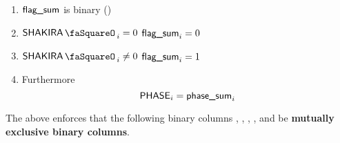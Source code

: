 \begin{enumerate}
	\item  $\textsf{flag\_sum}$ is binary \quad (\trash)
	\item \If $\shakiraStamp_{i} =    0$ \Then $\textsf{flag\_sum}_{i} = 0$
	\item \If $\shakiraStamp_{i} \neq 0$ \Then $\textsf{flag\_sum}_{i} = 1$
	\item Furthermore
	      \[
		      \textsf{PHASE}_{i} = \textsf{phase\_sum}_{i}
	      \]
\end{enumerate}
\saNote{} The above enforces that the following binary columns
\isShakiraKeccakData     {},
\isShakiraKeccakResult   {},
\isShakiraShaTwoData     {},
\isShakiraShaTwoResult   {},
\isShakiraRipemdData     {} and 
\isShakiraRipemdResult   {}
be \textbf{mutually exclusive binary columns}.
